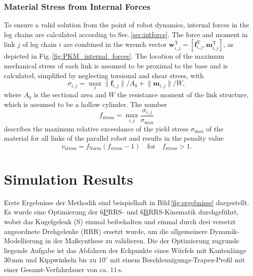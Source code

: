 \documentclass[fleqn,a4paper,10pt]{article}
\newcommand{\bm}[1]{\mathbf{#1}}
\newcommand{\transp}[0]{{\mathrm{T}}}
\begin{document}
\begin{multicols}{2}
\subsubsection{Material Stress from Internal Forces}

To ensure a valid solution from the point of robot dynamics, internal forces in the leg chains are calculated according to Sec.\,\ref{sec:intforce}.
The force and moment in link $j$ of leg chain $i$ are combined in the wrench vector $\bm{w}_{i,j}^\transp=[\bm{f}_{i,j}^\transp, \bm{m}_{i,j}^\transp]$, as depicted in Fig.\,\ref{fig:PKM_internal_forces}.
The location of the maximum mechanical stress of each link is assumed to be proximal to the base and is calculated, simplified by neglecting torsional and shear stress, with 
%
\begin{equation}
\sigma_{i,j} = \max\limits_{t} \lVert\bm{f}_{i,j}\rVert / A_0 + \lVert\bm{m}_{i,j}\rVert / W,
\end{equation}
%
where $A_0$ is the sectional area and $W$ the resistance moment of the link structure, which is assumed to be a hollow cylinder.
The number
%
\begin{equation}
f_\mathrm{stress} = \max\limits_{i,j} \frac{\sigma_{i,j}}{\sigma_{\mathrm{max}}} %
\end{equation}
%
describes the maximum relative exceedance of the yield stress $\sigma_{\mathrm{max}}$ of the material for all links of the parallel robot and results in the penalty value
%
\begin{equation}
v_{\mathrm{stress}} = f_\mathrm{Norm}(f_\mathrm{stress}-1)
\quad \mathrm{for} \quad 
f_\mathrm{stress} > 1.
\end{equation}


\section{Simulation Results}
\label{sec:results}

Erste Ergebnisse der Methodik sind beispielhaft in Bild\,\ref{fig:ergebnisse} dargestellt.
Es wurde eine Optimierung der 6\underline{P}RRS- und  6\underline{R}RRS-Kinematik durchgeführt, wobei das Kugelgelenk (S) einmal beibehalten und einmal durch drei versetzt angeordnete Drehgelenke (RRR) ersetzt wurde, um die allgemeinere Dynamik-Modellierung in der Maßsynthese zu validieren.
Die der Optimierung zugrunde liegende Aufgabe ist das Abfahren der Eckpunkte eines Würfels mit Kantenlänge $30\,\textrm{mm}$ und Kippwinkeln bis zu $10^\circ$ mit einem Beschleunigungs-Trapez-Profil mit einer Gesamt-Verfahrdauer von ca. $11\,\textrm{s}$.


\end{multicols}
\end{document}
